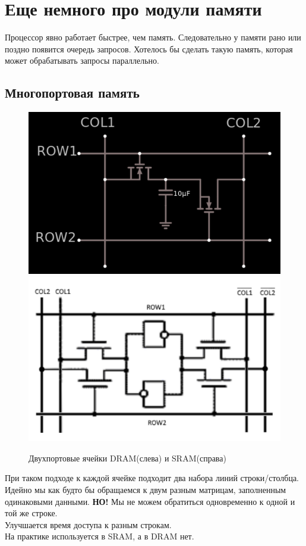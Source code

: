 \documentclass[12pt, a4paper]{article}
\begin{document}
\section{Еще немного про модули памяти}
Процессор явно работает быстрее, чем память. Следовательно у памяти рано или поздно появится очередь запросов. Хотелось бы сделать такую память, которая может обрабатывать запросы параллельно.
\subsection{Многопортовая память}
\begin{figure}[h]
    \centering
    \includegraphics[scale=0.3]{./images/MultiportDRAM.png}
    \includegraphics[scale=0.3]{./images/MultiportSRAM.png}
    \caption{Двухпортовые ячейки DRAM(слева) и SRAM(справа)}
    \label{fig:MultiportMEM}
\end{figure}
При таком подходе к каждой ячейке подходит два набора линий строки/столбца.\\
Идейно мы как будто бы обращаемся к двум разным матрицам, заполненным одинаковыми данными. \textbf{НО!} Мы не можем обратиться одновременно к одной и той же строке.\\
Улучшается время доступа к разным строкам.\\
На практике используется в SRAM, а в DRAM нет.
\end{document}
